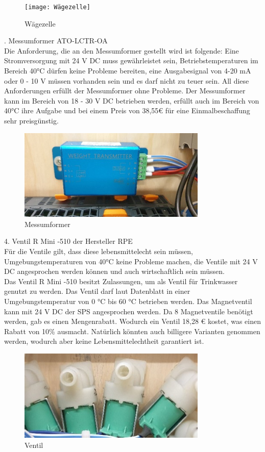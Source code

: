 \documentclass[10pt,a4paper]{report}
\begin{document}
	\begin{figure}[htb]
		\texttt{[image: Wägezelle]}
		\centering
		\caption{Wägezelle}
	\end{figure}
	. Messumformer ATO-LCTR-OA\\
	Die Anforderung, die an den Messumformer gestellt wird ist folgende: Eine Stromversorgung mit 24 V DC muss gewährleistet sein, Betriebstemperaturen im Bereich 40°C dürfen keine Probleme bereiten, eine Ausgabesignal von 4-20 mA oder 0 - 10 V müssen vorhanden sein und es darf nicht zu teuer sein. All diese Anforderungen erfüllt der Messumformer ohne Probleme. Der Messumformer kann im Bereich von 18 - 30 V DC betrieben werden, erfüllt auch im Bereich von 40°C ihre Aufgabe und bei einem Preis von 38,55€ für eine Einmalbeschaffung sehr preisgünstig.
	\begin{figure}[htb]
		\includegraphics[width=0.8\textwidth]{Messumformer}
		\centering
		\caption{Messumformer}
	\end{figure}
	
	4. Ventil R Mini -510 der Hersteller RPE\\
	Für die Ventile gilt, dass diese lebensmittelecht sein müssen, Umgebungstemperaturen von 40°C keine Probleme machen, die Ventile mit 24 V DC angesprochen werden können und auch wirtschaftlich sein müssen. \\
	Das Ventil R Mini -510 besitzt Zulassungen, um als Ventil für Trinkwasser genutzt zu werden. Das Ventil darf laut Datenblatt in einer Umgebungstemperatur von 0 °C bis 60 °C betrieben werden. Das Magnetventil kann mit 24 V DC der SPS angesprochen werden.
	Da 8 Magnetventile benötigt werden, gab es einen Mengenrabatt. Wodurch ein Ventil 18,28 € kostet, was einen Rabatt von 10\% ausmacht. Natürlich könnten auch billigere Varianten genommen werden, wodurch aber keine Lebensmittelechtheit garantiert ist.
	\begin{figure}[htb]
		\includegraphics[width=0.8\textwidth]{Ventil}
		\centering
		\caption{Ventil}
	\end{figure}
	
\end{document}

